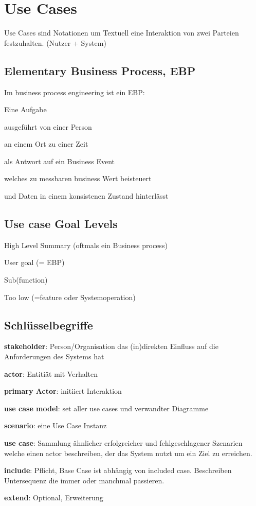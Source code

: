 \chapter{Use Cases}
Use Cases sind Notationen um Textuell eine Interaktion von
zwei Parteien festzuhalten. (Nutzer + System)

\section{Elementary Business Process, EBP}
Im business process engineering ist ein EBP:
\begin{compactitem}
    \item Eine Aufgabe
    \item ausgeführt von einer Person
    \item an einem Ort zu einer Zeit
    \item als Antwort auf ein Business Event
    \item welches zu messbaren business Wert beisteuert
    \item und Daten in einem konsistenen Zustand hinterlässt
\end{compactitem}

\section{Use case Goal Levels}
\begin{compactitem}
    \item High Level Summary (oftmals ein Business process)
    \item User goal (= EBP)
    \item Sub(function)
    \item Too low (=feature oder Systemoperation)
\end{compactitem}

\section{Schlüsselbegriffe}
\begin{compactitem}
    \item \textbf{stakeholder}: Person/Organisation das (in)direkten Einfluss
    auf die Anforderungen des Systems hat
    \item \textbf{actor}: Entitiät mit Verhalten
    \item \textbf{primary Actor}: initiiert Interaktion
    \item \textbf{use case model}: set aller use cases und verwandter Diagramme
    \item \textbf{scenario}: eine Use Case Instanz
    \item \textbf{use case}: Sammlung ähnlicher erfolgreicher und fehlgeschlagener
    Szenarien welche einen actor beschreiben, der das System nutzt um ein Ziel
    zu erreichen.
    \item \textbf{include}: Pflicht, Base Case ist abhängig von included case.
    Beschreiben Untersequenz die immer oder manchmal passieren.
    \item \textbf{extend}: Optional, Erweiterung
\end{compactitem}

